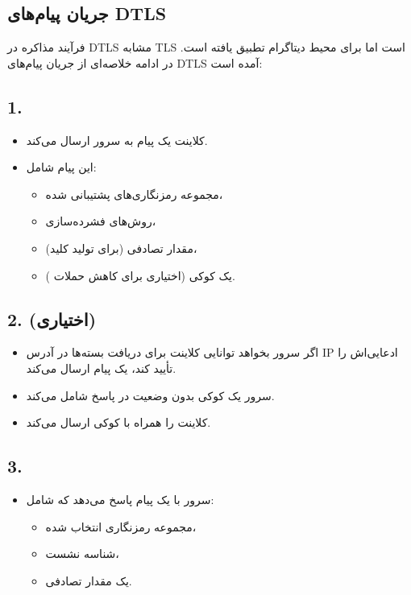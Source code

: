 \subsection*{جریان پیام‌های DTLS}

فرآیند مذاکره در DTLS مشابه TLS است اما برای محیط دیتاگرام تطبیق یافته است. در ادامه خلاصه‌ای از جریان پیام‌های DTLS آمده است:

\subsection*{1. }
\begin{itemize}
    \item کلاینت یک پیام  به سرور ارسال می‌کند.
    \item این پیام شامل:
    \begin{itemize}
        \item مجموعه رمزنگاری‌های پشتیبانی شده،
        \item روش‌های فشرده‌سازی،
        \item مقدار تصادفی (برای تولید کلید)،
        \item یک کوکی (اختیاری برای کاهش حملات ).
    \end{itemize}
\end{itemize}

\subsection*{2.  (اختیاری)}
\begin{itemize}
    \item اگر سرور بخواهد توانایی کلاینت برای دریافت بسته‌ها در آدرس IP ادعایی‌اش را تأیید کند، یک پیام  ارسال می‌کند.
    \item سرور یک کوکی بدون وضعیت در پاسخ شامل می‌کند.
    \item کلاینت  را همراه با کوکی ارسال می‌کند.
\end{itemize}

\subsection*{3. }
\begin{itemize}
    \item سرور با یک پیام  پاسخ می‌دهد که شامل:
    \begin{itemize}
        \item مجموعه رمزنگاری انتخاب شده،
        \item شناسه نشست،
        \item یک مقدار تصادفی.
    \end{itemize}
\end{itemize}

